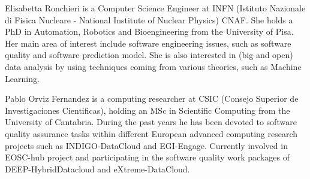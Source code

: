 \documentclass[journal]{IEEEtran}
\begin{document}
\begin{IEEEbiography} {Elisabetta Ronchieri}
is a Computer Science Engineer at INFN (Istituto Nazionale di Fisica Nucleare - National Institute of Nuclear Physics) CNAF. She holds a PhD in Automation, Robotics and Bioengineering from the University of Pisa. Her main area of interest include software engineering issues, such as software quality and software prediction model. She is also interested in (big and open) data analysis by using techniques coming from various theories, such as Machine Learning.
\end{IEEEbiography}

\begin{IEEEbiography}{Pablo Orviz Fernandez}
is a computing researcher at CSIC (Consejo Superior de Investigaciones
Cientificas), holding an MSc in Scientific Computing from the University of
Cantabria. During the past years he has been devoted to software quality
assurance tasks within different European advanced computing research projects
such as INDIGO-DataCloud and EGI-Engage. Currently involved in EOSC-hub project
and participating in the software quality work packages of DEEP-HybridDatacloud
and eXtreme-DataCloud.
\end{IEEEbiography}
\end{document}

